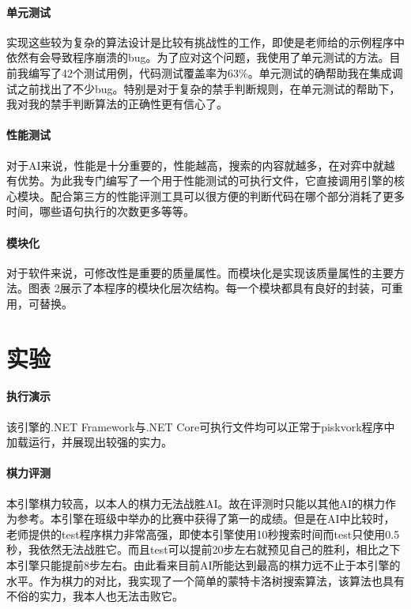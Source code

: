 \documentclass{ctexart}
\begin{document}
\paragraph{单元测试} 实现这些较为复杂的算法设计是比较有挑战性的工作，即使是老师给的示例程序中依然有会导致程序崩溃的bug。为了应对这个问题，我使用了单元测试的方法。目前我编写了42个测试用例，代码测试覆盖率为63\%。单元测试的确帮助我在集成调试之前找出了不少bug。特别是对于复杂的禁手判断规则，在单元测试的帮助下，我对我的禁手判断算法的正确性更有信心了。

\paragraph{性能测试} 对于AI来说，性能是十分重要的，性能越高，搜索的内容就越多，在对弈中就越有优势。为此我专门编写了一个用于性能测试的可执行文件，它直接调用引擎的核心模块。配合第三方的性能评测工具可以很方便的判断代码在哪个部分消耗了更多时间，哪些语句执行的次数更多等等。

\paragraph{模块化} 对于软件来说，可修改性是重要的质量属性。而模块化是实现该质量属性的主要方法。图表 2展示了本程序的模块化层次结构。每一个模块都具有良好的封装，可重用，可替换。

\section{实验}

\paragraph{执行演示} 该引擎的.NET Framework与.NET Core可执行文件均可以正常于piskvork程序中加载运行，并展现出较强的实力。

\paragraph{棋力评测} 本引擎棋力较高，以本人的棋力无法战胜AI。故在评测时只能以其他AI的棋力作为参考。本引擎在班级中举办的比赛中获得了第一的成绩。但是在AI中比较时，老师提供的test程序棋力非常高强，即使本引擎使用10秒搜索时间而test只使用0.5秒，我依然无法战胜它。而且test可以提前20步左右就预见自己的胜利，相比之下本引擎只能提前8步左右。由此看来目前AI所能达到最高的棋力远不止于本引擎的水平。作为棋力的对比，我实现了一个简单的蒙特卡洛树搜索算法，该算法也具有不俗的实力，我本人也无法击败它。
\end{document}
